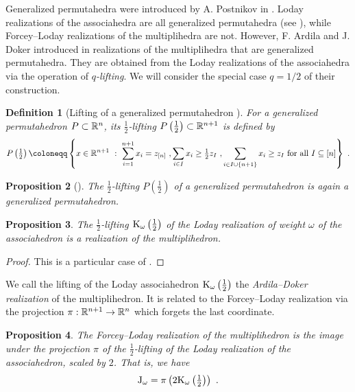 \documentclass[twoside, 11pt]{amsart}
\newtheorem{definition}{Definition}[section]
\newtheorem{proposition}[definition]{Proposition}
\theoremstyle{remark}
\begin{document}
Generalized permutahedra were introduced by A. Postnikov in \cite{Postnikov09}.
Loday realizations of the associahedra are all generalized permutahedra (see \cite[Corollary 8.2]{Postnikov09}), while Forcey--Loday realizations of the multiplihedra are not. 
However, F. Ardila and J. Doker introduced in \cite{AD13} realizations of the multiplihedra that are generalized permutahedra. 
They are obtained from the Loday realizations of the associahedra via the operation of \emph{$q$-lifting}. 
We will consider the special case $q=1/2$ of their construction.

\begin{definition}[Lifting of a generalized permutahedron {\cite[Definition 2.3]{AD13}}]
For a generalized permutahedron $P\subset \mathbb{R}^n$, its \emph{$\tfrac{1}{2}$-lifting} $P \left(\tfrac{1}{2}\right) \subset \mathbb{R}^{n+1}$ is defined by 
\[P \left(\tfrac{1}{2}\right) \coloneqq \left\{ x \in \RR^{n+1} \ : \ 
\sum_{i=1}^{n+1} x_i = z_{[n]} \ , 
\sum_{i \in I} x_i \geq \tfrac{1}{2}z_I \ ,
\sum_{i \in I \cup \{n+1\}} x_i \geq z_I 
\text{ for all } I \subseteq [n] \right\} \ . \]
\end{definition}

\begin{proposition}[{\cite[Proposition 2.4]{AD13}}] 
The $\tfrac{1}{2}$-lifting $P \left(\tfrac{1}{2}\right)$ of a generalized permutahedron is again a generalized permutahedron. 
\end{proposition}

\begin{proposition} 
The $\tfrac{1}{2}$-lifting $\mathrm{K}_\omega\left(\tfrac{1}{2}\right)$ of the Loday realization of weight $\omega$ of the associahedron is a realization of the multiplihedron. 
\end{proposition}
\begin{proof} 
This is a particular case of \cite[Corollary 4.10]{AD13}.
\end{proof}

We call the lifting of the Loday associahedron $\mathrm{K}_\omega\left(\tfrac{1}{2}\right)$ the\emph{ Ardila--Doker realization} of the multiplihedron. It is related to the Forcey--Loday realization via the projection $\pi: \mathbb{R}^{n+1} \to \mathbb{R}^n$ which forgets the last coordinate. 
 
\begin{proposition} 
\label{prop:lifting} 
The Forcey--Loday realization of the multiplihedron is the image under the projection $\pi$ of the $\tfrac{1}{2}$-lifting of the Loday realization of the associahedron, scaled by $2$. 
That is, we have  \[ \mathrm{J}_\omega = \pi \left(2 \mathrm{K}_\omega\left(\tfrac{1}{2}\right)\right) \ . \]
\end{proposition}
\end{document}
